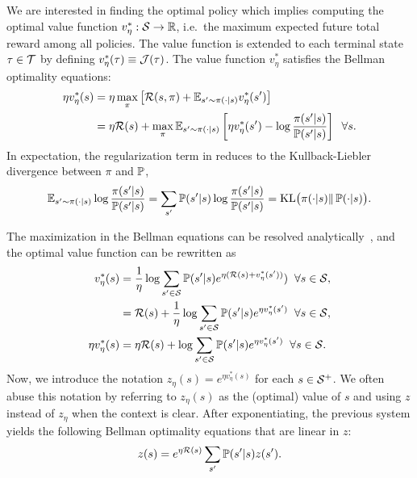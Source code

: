 We are interested in finding the optimal policy which implies computing the optimal value function ${v^*_\eta:\mathcal{S}\rightarrow\mathbb{R}}$, i.e.~the maximum expected future total reward among all policies. The value function is extended to each terminal state $\tau\in\mathcal{T}$ by defining $v^*_\eta(\tau)\equiv\mathcal{J}(\tau)$. The value function $v^*_\eta$ satisfies the Bellman optimality equations:
\begin{align*}
  \eta v^*_\eta(s) &= \eta \max_\pi \left[ \mathcal{R}(s,\pi) + \mathbb{E}_{s'\sim\pi(\cdot|s)} v^*_\eta(s') \right] \\
  &= \eta \mathcal{R}(s) + \max_\pi \mathbb{E}_{s'\sim\pi(\cdot|s)} \left[ \eta v^*_\eta(s') - \log \frac {\pi(s'|s)} {\mathbb{P}(s'|s)} \right] \;\; \forall s.
\end{align*}
In expectation, the regularization term in reduces to the Kullback-Liebler divergence between $\pi$ and $\mathbb{P}$,
\begin{equation*}
  \mathbb{E}_{s'\sim\pi(\cdot|s)} \log \frac {\pi(s'|s)} {\mathbb{P}(s'|s)} = \sum_{s'}\mathbb{P}(s'\lvert s)\log\frac{\pi(s'\lvert s)}{\mathbb{P}(s'\lvert s)} = \mathrm{KL}\big(\pi(\cdot|s)\Vert\, \mathbb{P}(\cdot|s)\big).
\end{equation*}

The maximization in the Bellman equations can be resolved analytically~\citep{Todorov2006}, and the optimal value function can be rewritten as
\begin{align*}
  v^*_\eta(s)      &=  \frac 1 \eta \log{\sum_{s'\in\mathcal{S}}\mathbb{P}(s'\lvert s)e^{\eta(\mathcal{R}(s) + v^*_\eta(s'))})} \;\;\forall s\in\mathcal{S}, \\
                   &=  \mathcal{R}(s) + \frac 1 \eta \log{\sum_{s'\in\mathcal{S}}\mathbb{P}(s'\lvert s)e^{\eta v^*_\eta(s')}} \;\;\forall s\in\mathcal{S}, \\
  \eta v^*_\eta(s) &=  \eta \mathcal{R}(s) + \log{\sum_{s'\in\mathcal{S}}\mathbb{P}(s'\lvert s)e^{\eta v^*_\eta(s')}} \;\;\forall s\in\mathcal{S}.
\end{align*}
Now, we introduce the notation $z_\eta(s)=e^{\eta v^*_\eta(s)}$ for each $s\in\mathcal{S}^+$. We often abuse this notation by referring to $z_\eta(s)$ as the (optimal) value of $s$ and using $z$ instead of $z_\eta$ when the context is clear. After exponentiating, the previous system yields the following Bellman optimality equations that are linear in $z$:
\begin{equation}\label{eq:boe_z_lmdp}
z(s) = e^{\eta\mathcal{R}(s)} \sum_{s'}\mathbb{P}(s'|s)z(s').
\end{equation}

